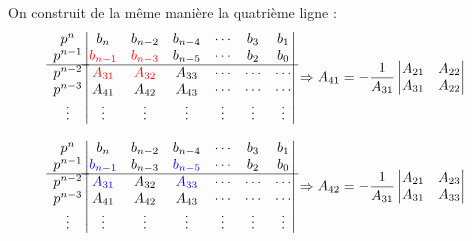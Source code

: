 On construit de la même manière la quatrième ligne :
\[
\begin{matrix}
    p^n    \\
    p^{n-1}\\
    \hline
    p^{n-2}\\
    p^{n-3}\\
    \vdots \\
\end{matrix}
\begin{vmatrix}
    b_n       & b_{n-2}    & b_{n-4}    & \cdots & b_3            & b_1         \\
     \textcolor{red}{b_{n-1}}   &  \textcolor{red}{b_{n-3}}    & b_{n-5}    & \cdots & b_2            & b_0         \\
    \hline
     \textcolor{red}{A_{31}}     &  \textcolor{red}{A_{32}}    & A_{33}    & \cdots & \cdots         & \cdots      \\
    A_{41}      & A_{42}     & A_{43}    & \cdots & \cdots         & \cdots      \\
    \vdots    & \vdots     & \vdots     & \vdots & \vdots         & \vdots      \\
    \end{vmatrix}
\Rightarrow
A_{41}=-\dfrac{1}{A_{31}}\begin{vmatrix} A_{21} & A_{22} \\ A_{31} & A_{22} \end{vmatrix}
\]

\[
\begin{matrix}
    p^n    \\
    p^{n-1}\\
    \hline
    p^{n-2}\\
    p^{n-3}\\
    \vdots \\
\end{matrix}
\begin{vmatrix}
    b_n       & b_{n-2}    & b_{n-4}    & \cdots & b_3            & b_1         \\
     \textcolor{blue}{b_{n-1}}   &  b_{n-3}    & \textcolor{blue}{b_{n-5}}    & \cdots & b_2            & b_0         \\
    \hline
     \textcolor{blue}{A_{31}}     &  A_{32}    & \textcolor{blue}{A_{33}}    & \cdots & \cdots         & \cdots      \\
    A_{41}      & A_{42}     & A_{43}    & \cdots & \cdots         & \cdots      \\
    \vdots    & \vdots     & \vdots     & \vdots & \vdots         & \vdots      \\
    \end{vmatrix}
\Rightarrow
A_{42}=-\dfrac{1}{A_{31}}\begin{vmatrix} A_{21} & A_{23} \\ A_{31} & A_{33} \end{vmatrix}
\]

